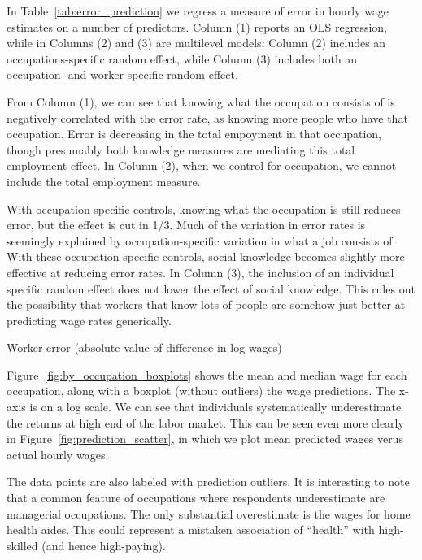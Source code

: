 \documentclass[11pt]{article}
\begin{document}
In Table~\ref{tab:error_prediction} we regress a measure of error in hourly wage estimates on a number of predictors. 
Column (1) reports an OLS regression, while in Columns (2) and (3) are multilevel models: 
Column (2) includes an occupations-specific random effect, while Column (3) includes both an occupation- and worker-specific random effect. 

From Column (1), we can see that knowing what the occupation consists of is negatively correlated with the error rate, as knowing more people who have that occupation. 
Error is decreasing in the total empoyment in that occupation, though presumably both knowledge measures are mediating this total employment effect. 
In Column (2), when we control for occupation, we cannot include the total employment measure. 

With occupation-specific controls, knowing what the occupation is still reduces error, but the effect is cut in 1/3. 
Much of the variation in error rates is seemingly explained by occupation-specific variation in what a job consists of. 
With these occupation-specific controls, social knowledge becomes slightly more effective at reducing error rates. 
In Column (3), the inclusion of an individual specific random effect does not lower the effect of social knowledge. 
This rules out the possibility that workers that know lots of people are somehow just better at predicting wage rates generically.  

\begin{table}
\centering 
\caption{Worker error (absolute value of difference in log wages) \label{tab:error_prediction}}
  
\end{table} 

Figure~\ref{fig:by_occupation_boxplots} shows the mean and median wage for each occupation, along with a boxplot (without outliers) the wage predictions. 
The x-axis is on a log scale. 
We can see that individuals systematically underestimate the returns at high end of the labor market. 
This can be seen even more clearly in Figure~\ref{fig:prediction_scatter}, in which we plot mean predicted wages verus actual hourly wages. 

The data points are also labeled with prediction outliers. 
It is interesting to note that a common feature of occupations where respondents underestimate are managerial occupations.  
The only substantial overestimate is the wages for home health aides. 
This could represent a mistaken association of ``health'' with high-skilled (and hence high-paying). 
\end{document}
